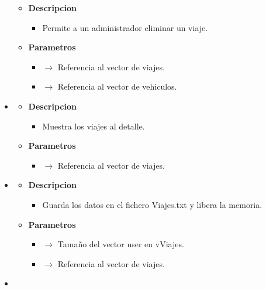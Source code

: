 \begin{itemize}
    \begin{itemize}
        \item \textbf{Descripcion}
        \begin{itemize}
			\item Permite a un administrador eliminar un viaje.
		\end{itemize}
		\item \textbf{Parametros}
		\begin{itemize}
			\item {}  $\rightarrow$ Referencia al vector de viajes.
            \item {} $\rightarrow$ Referencia al vector de vehiculos.
		\end{itemize}
	\end{itemize}
    \item {}
    \begin{itemize}
        \item \textbf{Descripcion}
        \begin{itemize}
			\item  Muestra los viajes al detalle.
		\end{itemize}
		\item \textbf{Parametros}
		\begin{itemize}
			\item {}  $\rightarrow$ Referencia al vector de viajes.
		\end{itemize}
	\end{itemize}
    \item {}
    \begin{itemize}
        \item \textbf{Descripcion}
        \begin{itemize}
			\item  Guarda los datos en el fichero Viajes.txt y libera la memoria.
		\end{itemize}
		\item \textbf{Parametros}
		\begin{itemize}
            \item {} $\rightarrow$ Tamaño del vector user en vViajes.
			\item {} $\rightarrow$ Referencia al vector de viajes.
		\end{itemize}
	\end{itemize}
    \item {}
    \begin{itemize}

\end{itemize}
\end{itemize}
